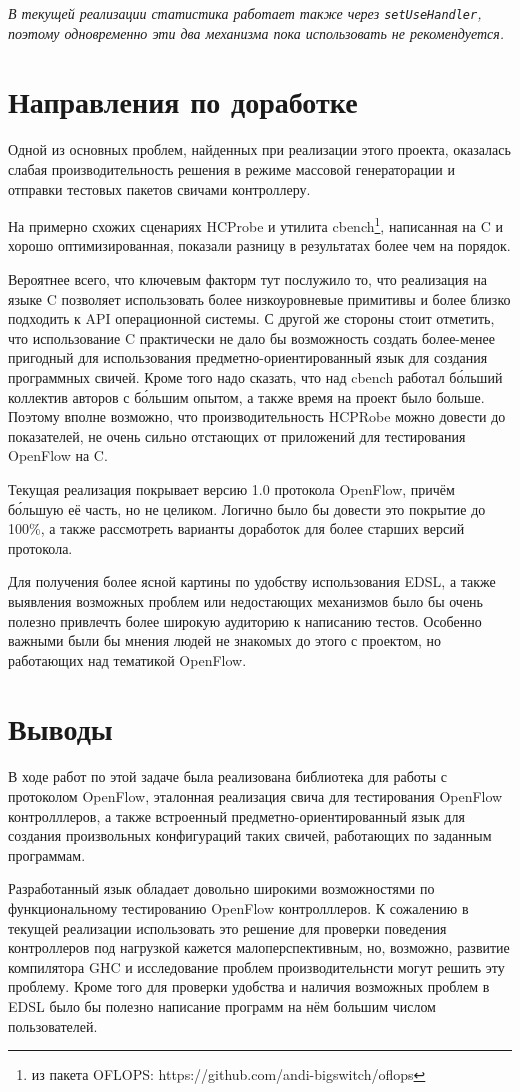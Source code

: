 \documentclass[9pt,a4paper]{article}
\begin{document}
\emph{В текущей реализации статистика работает также через \lstinline!setUseHandler!,
поэтому одновременно эти два механизма пока использовать не рекомендуется.}

\section{Направления по доработке}

Одной из основных проблем, найденных при реализации этого проекта, оказалась
слабая производительность решения в режиме массовой генераторации и отправки
тестовых пакетов свичами контроллеру.

На примерно схожих сценариях HCProbe и утилита cbench\footnote{из пакета OFLOPS:
https://github.com/andi-bigswitch/oflops}, написанная на C и хорошо оптимизированная,
показали разницу в результатах более чем на порядок.

Вероятнее всего, что ключевым факторм тут послужило то, что реализация на языке C
позволяет использовать более низкоуровневые примитивы и более близко подходить
к API операционной системы. С другой же стороны стоит отметить, что использование
C практически не дало бы возможность создать более-менее пригодный для
использования предметно-ориентированный язык для создания программных свичей.
Кроме того надо сказать, что над cbench работал б\'{о}льший коллектив авторов с
б\'{о}льшим опытом, а также время на проект было больше. Поэтому вполне возможно,
что производительность HCPRobe можно довести до показателей, не очень сильно
отстающих от приложений для тестирования OpenFlow на C.

Текущая реализация покрывает версию 1.0 протокола OpenFlow, причём б\'{о}льшую
её часть, но не целиком. Логично было бы довести это покрытие до 100\%, а также
рассмотреть варианты доработок для более старших версий протокола.

Для получения более ясной картины по удобству использования EDSL, а также
выявления возможных проблем или недостающих механизмов было бы очень полезно
привлечть более широкую аудиторию к написанию тестов. Особенно важными были
бы мнения людей не знакомых до этого с проектом, но работающих над тематикой
OpenFlow.


\clearpage

\section{Выводы}

В ходе работ по этой задаче была реализована библиотека для работы с протоколом
OpenFlow, эталонная реализация свича для тестирования OpenFlow контролллеров, а
также встроенный предметно-ориентированный язык для создания произвольных
конфигураций таких свичей, работающих по заданным программам.

Разработанный язык обладает довольно широкими возможностями по функциональному тестированию
OpenFlow контролллеров. К сожалению в текущей реализации использовать это
решение для проверки поведения контроллеров под нагрузкой кажется малоперспективным,
но, возможно, развитие компилятора GHC и исследование проблем производительнсти
могут решить эту проблему. Кроме того для проверки удобства и наличия возможных
проблем в EDSL было бы полезно написание программ на нём большим числом
пользователей.
\end{document}
